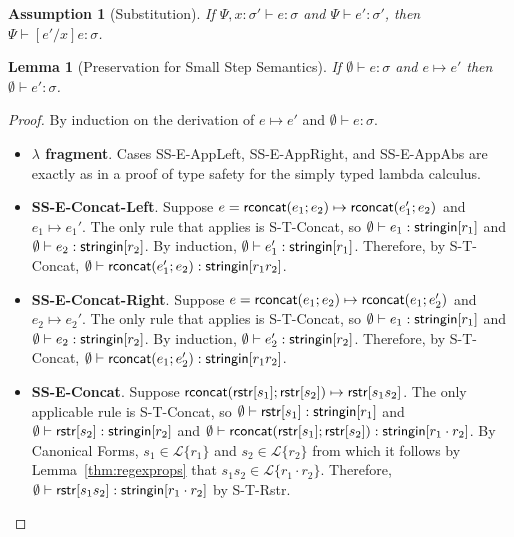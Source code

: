 \documentclass[11pt,leqno]{article}
\newtheorem{trlem}[tr]{Lemma}
\newtheorem{ass}[tr]{Assumption}
\theoremstyle{definition}
\newcommand{\Lagr}{\mathcal{L}}
\newcommand{\lang}[1]{\Lagr\{#1\}}
\newcommand{\stringin}[1]{{\sf stringin}[#1]}
\begin{document}
\begin{ass}[Substitution] \label{lem:subst}
If $\Psi, x : \sigma' \vdash e : \sigma$ and $\Psi \vdash e' : \sigma'$, then
$\Psi \vdash [e' / x] e : \sigma$.
\end{ass}

\begin{trlem}[Preservation for Small Step Semantics]
If $\emptyset \vdash e : \sigma$ and $e \mapsto e'$ then $\emptyset \vdash e' : \sigma$.
\end{trlem}
\begin{proof}

By induction on the derivation of $e \mapsto e'$ and $\emptyset \vdash e : \sigma$.

\begin{itemize}[label=$ $,itemsep=1ex]
\item \textbf{$\lambda$ fragment}. Cases SS-E-AppLeft, SS-E-AppRight, and SS-E-AppAbs are exactly as in a proof of type safety for
the simply typed lambda calculus.

\item \textbf{SS-E-Concat-Left}.
Suppose $e = {\sf rconcat}(e_1;e_2) \mapsto {\sf rconcat}(e_1';e_2)$ and $e_1 \mapsto e_1'$.
The only rule that applies is S-T-Concat, so $\emptyset\vdash e_1 : \stringin{r_1}$ and $\emptyset\vdash e_2 : \stringin{r_2}$.
By induction, $\emptyset\vdash e_1' : \stringin{r_1}$.
Therefore, by S-T-Concat, $\emptyset\vdash \rconcat{e_1'}{e_2} : \stringin{r_1r_2}$.

\item {\textbf{SS-E-Concat-Right}}. 
Suppose $e = {\sf rconcat}(e_1;e_2) \mapsto {\sf rconcat}(e_1;e_2')$ and $e_2 \mapsto e_2'$.
The only rule that applies is S-T-Concat, so $\emptyset\vdash e_1 : \stringin{r_1}$ and $\emptyset\vdash e_2 : \stringin{r_2}$.
By induction, $\emptyset\vdash e_2' : \stringin{r_2}$.
Therefore, by S-T-Concat, $\emptyset\vdash \rconcat{e_1}{e_2'} : \stringin{r_1r_2}$.


\item \textbf{SS-E-Concat}. 
Suppose ${\sf rconcat}({\sf rstr}[s_1];{\sf rstr}[s_2]) \mapsto {\sf rstr}[s_1s_2]$.
The only applicable rule is S-T-Concat, so 
$\emptyset\vdash\rstr{s_1} : \stringin{r_1}$ 
and
$\emptyset\vdash\rstr{s_2} : \stringin{r_2}$ and $\emptyset \vdash \rconcat{\rstr{s_1}}{\rstr{s_2}} : \stringin{r_1 \cdot r_2}$. 
By Canonical Forms, $s_1 \in \lang{r_1}$ and $s_2 \in  \lang{r_2}$ from which it follows by Lemma~\ref{thm:regexprops}
that $s_1s_2 \in \lang{r_1\cdot r_2}$. Therefore, $\emptyset\vdash \rstr{s_1s_2} : \stringin{r_1\cdot r_2}$ by S-T-Rstr.


\end{itemize}
\end{proof}
\end{document}
